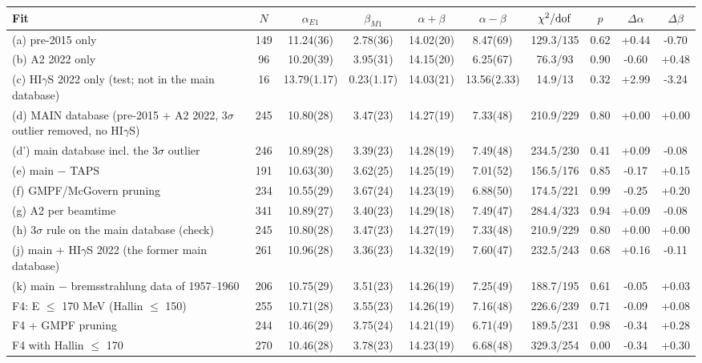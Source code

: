 \begin{tabular}{lccccccccc}
\hline
Fit & $N$ & $\alpha_{E1}$ & $\beta_{M1}$ & $\alpha+\beta$ & $\alpha-\beta$ & $\chi^2/{\rm dof}$ & $p$ & $\Delta\alpha$ & $\Delta\beta$ \\
\hline
(a) pre-2015 only & 149 & 11.24(36) & 2.78(36) & 14.02(20) & 8.47(69) & 129.3/135 & 0.62 & +0.44 & -0.70 \\
(b) A2 2022 only & 96 & 10.20(39) & 3.95(31) & 14.15(20) & 6.25(67) & 76.3/93 & 0.90 & -0.60 & +0.48 \\
(c) HI$\gamma$S 2022 only (test; not in the main database) & 16 & 13.79(1.17) & 0.23(1.17) & 14.03(21) & 13.56(2.33) & 14.9/13 & 0.32 & +2.99 & -3.24 \\
(d) MAIN database (pre-2015 + A2 2022, 3$\sigma$ outlier removed, no HI$\gamma$S) & 245 & 10.80(28) & 3.47(23) & 14.27(19) & 7.33(48) & 210.9/229 & 0.80 & +0.00 & +0.00 \\
(d') main database incl. the 3$\sigma$ outlier & 246 & 10.89(28) & 3.39(23) & 14.28(19) & 7.49(48) & 234.5/230 & 0.41 & +0.09 & -0.08 \\
(e) main $-$ TAPS & 191 & 10.63(30) & 3.62(25) & 14.25(19) & 7.01(52) & 156.5/176 & 0.85 & -0.17 & +0.15 \\
(f) GMPF/McGovern pruning & 234 & 10.55(29) & 3.67(24) & 14.23(19) & 6.88(50) & 174.5/221 & 0.99 & -0.25 & +0.20 \\
(g) A2 per beamtime & 341 & 10.89(27) & 3.40(23) & 14.29(18) & 7.49(47) & 284.4/323 & 0.94 & +0.09 & -0.08 \\
(h) 3$\sigma$ rule on the main database (check) & 245 & 10.80(28) & 3.47(23) & 14.27(19) & 7.33(48) & 210.9/229 & 0.80 & +0.00 & +0.00 \\
(j) main + HI$\gamma$S 2022 (the former main database) & 261 & 10.96(28) & 3.36(23) & 14.32(19) & 7.60(47) & 232.5/243 & 0.68 & +0.16 & -0.11 \\
(k) main $-$ bremsstrahlung data of 1957–1960 & 206 & 10.75(29) & 3.51(23) & 14.26(19) & 7.25(49) & 188.7/195 & 0.61 & -0.05 & +0.03 \\
F4: E $\le$ 170 MeV (Hallin $\le$ 150) & 255 & 10.71(28) & 3.55(23) & 14.26(19) & 7.16(48) & 226.6/239 & 0.71 & -0.09 & +0.08 \\
F4 + GMPF pruning & 244 & 10.46(29) & 3.75(24) & 14.21(19) & 6.71(49) & 189.5/231 & 0.98 & -0.34 & +0.28 \\
F4 with Hallin $\le$ 170 & 270 & 10.46(28) & 3.78(23) & 14.23(19) & 6.68(48) & 329.3/254 & 0.00 & -0.34 & +0.30 \\
\hline
\end{tabular}

